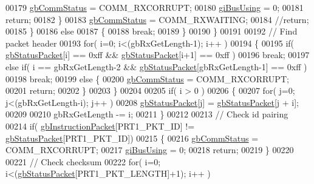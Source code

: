 \begin{DoxyCode}
00179                     \hyperlink{classdynamixel_a5b603f6bed7ccc595f1f50bd6a6ebbfc}{gbCommStatus} = COMM\_RXCORRUPT;
00180                 \hyperlink{classdynamixel_ad10e0e49f5fef04bf789a89c14cc470a}{giBusUsing} = 0;
00181                 \textcolor{keywordflow}{return};
00182             \}
00183             \hyperlink{classdynamixel_a5b603f6bed7ccc595f1f50bd6a6ebbfc}{gbCommStatus} = COMM\_RXWAITING;
00184             \textcolor{comment}{//return;           }
00185         \}
00186         \textcolor{keywordflow}{else}
00187         \{
00188             \textcolor{keywordflow}{break};
00189         \}
00190     \}
00191 
00192     \textcolor{comment}{// Find packet header}
00193     \textcolor{keywordflow}{for}( i=0; i<(gbRxGetLength-1); i++ )
00194     \{
00195         \textcolor{keywordflow}{if}( \hyperlink{classdynamixel_aa57c86d3bbbeaf5c9d4f6bd00376b04f}{gbStatusPacket}[i] == 0xff && \hyperlink{classdynamixel_aa57c86d3bbbeaf5c9d4f6bd00376b04f}{gbStatusPacket}[i+1] == 0xff )
00196             \textcolor{keywordflow}{break};
00197         \textcolor{keywordflow}{else} \textcolor{keywordflow}{if}( i == gbRxGetLength-2 && \hyperlink{classdynamixel_aa57c86d3bbbeaf5c9d4f6bd00376b04f}{gbStatusPacket}[gbRxGetLength-1] == 0xff )
00198             \textcolor{keywordflow}{break};
00199         \textcolor{keywordflow}{else} \{
00200             \hyperlink{classdynamixel_a5b603f6bed7ccc595f1f50bd6a6ebbfc}{gbCommStatus} = COMM\_RXCORRUPT;
00201             \textcolor{keywordflow}{return};
00202         \}
00203     \}
00204 
00205     \textcolor{keywordflow}{if}( i > 0 )
00206     \{
00207         \textcolor{keywordflow}{for}( j=0; j<(gbRxGetLength-i); j++ )
00208             \hyperlink{classdynamixel_aa57c86d3bbbeaf5c9d4f6bd00376b04f}{gbStatusPacket}[j] = \hyperlink{classdynamixel_aa57c86d3bbbeaf5c9d4f6bd00376b04f}{gbStatusPacket}[j + i];
00209             
00210         gbRxGetLength -= i;     
00211     \}
00212 
00213     \textcolor{comment}{// Check id pairing}
00214     \textcolor{keywordflow}{if}( \hyperlink{classdynamixel_afd94dcf01b8e96298727776e222de722}{gbInstructionPacket}[PRT1\_PKT\_ID] != \hyperlink{classdynamixel_aa57c86d3bbbeaf5c9d4f6bd00376b04f}{gbStatusPacket}[PRT1\_PKT\_ID])
00215     \{
00216         \hyperlink{classdynamixel_a5b603f6bed7ccc595f1f50bd6a6ebbfc}{gbCommStatus} = COMM\_RXCORRUPT;
00217         \hyperlink{classdynamixel_ad10e0e49f5fef04bf789a89c14cc470a}{giBusUsing} = 0;
00218         \textcolor{keywordflow}{return};
00219     \}
00220     
00221     \textcolor{comment}{// Check checksum}
00222     \textcolor{keywordflow}{for}( i=0; i<(\hyperlink{classdynamixel_aa57c86d3bbbeaf5c9d4f6bd00376b04f}{gbStatusPacket}[PRT1\_PKT\_LENGTH]+1); i++ )

\end{DoxyCode}

